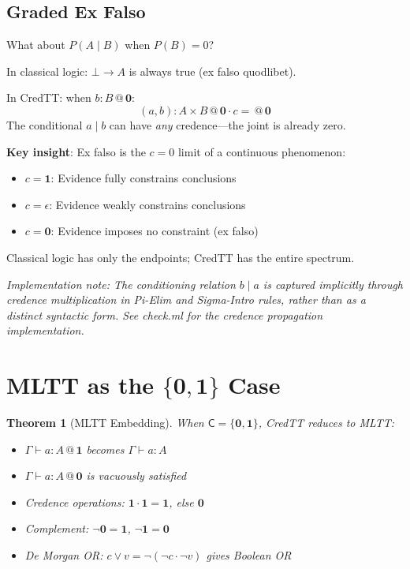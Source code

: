 \documentclass[11pt,a4paper]{article}
\makeatletter
\newtheorem{theorem}{Theorem}[section]
\newcommand{\C}{\mathsf{C}}
\newcommand{\at}[1]{\,@\,#1}
\newcommand{\one}{\mathbf{1}}
\newcommand{\zero}{\mathbf{0}}
\newcommand{\negc}{\neg}
\makeatother
\begin{document}
\subsection{Graded Ex Falso}

What about $P(A \mid B)$ when $P(B) = 0$?

In classical logic: $\bot \to A$ is always true (ex falso quodlibet).

In CredTT: when $b : B \at{\zero}$:
\[
(a, b) : A \times B \at{\zero \cdot c} = \at{\zero}
\]
The conditional $a \mid b$ can have \emph{any} credence---the joint is already zero.

\textbf{Key insight}: Ex falso is the $c = 0$ limit of a continuous phenomenon:
\begin{itemize}
    \item $c = \one$: Evidence fully constrains conclusions
    \item $c = \epsilon$: Evidence weakly constrains conclusions
    \item $c = \zero$: Evidence imposes no constraint (ex falso)
\end{itemize}

Classical logic has only the endpoints; CredTT has the entire spectrum.

\emph{Implementation note: The conditioning relation $b \mid a$ is captured implicitly through credence multiplication in Pi-Elim and Sigma-Intro rules, rather than as a distinct syntactic form. See check.ml for the credence propagation implementation.}

\section{MLTT as the $\{\zero, \one\}$ Case}

\begin{theorem}[MLTT Embedding]\label{thm:mltt-embedding}
When $\C = \{\zero, \one\}$, CredTT reduces to MLTT:
\begin{itemize}
    \item $\Gamma \vdash a : A \at{\one}$ becomes $\Gamma \vdash a : A$
    \item $\Gamma \vdash a : A \at{\zero}$ is vacuously satisfied
    \item Credence operations: $\one \cdot \one = \one$, else $\zero$
    \item Complement: $\negc\zero = \one$, $\negc\one = \zero$
    \item De Morgan OR: $c \vee v = \negc(\negc c \cdot \negc v)$ gives Boolean OR
\end{itemize}
\end{theorem}
\end{document}
